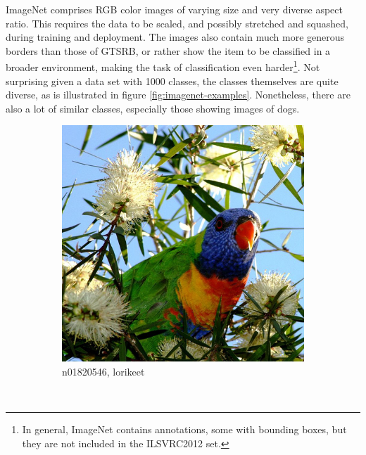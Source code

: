 \documentclass[11pt, a4paper]{article}
\begin{document}
ImageNet comprises RGB color images of varying size and very diverse aspect ratio. This requires the data to be scaled, and possibly stretched and squashed, during training and deployment. The images also contain much more generous borders than those of GTSRB, or rather show the item to be classified in a broader environment, making the task of classification even harder\footnote{In general, ImageNet contains annotations, some with bounding boxes, but they are not included in the ILSVRC2012 set.}. Not surprising given a data set with 1000 classes, the classes themselves are quite diverse, as is illustrated in figure \ref{fig:imagenet-examples}. Nonetheless, there are also a lot of similar classes, especially those showing images of dogs.

\begin{figure}[h!tb]
    \centering
    \begin{subfigure}[t]{0.30\textwidth}
    		\centering
        \includegraphics[width=\textwidth]{imagenet/examples/n01820546_31.JPEG}
        \caption{n01820546, lorikeet}
        \label{fig:imagenet-examples-1}
    \end{subfigure}
    ~ %
    \begin{subfigure}[t]{0.30\textwidth}

\end{subfigure}
\end{figure}
\end{document}
